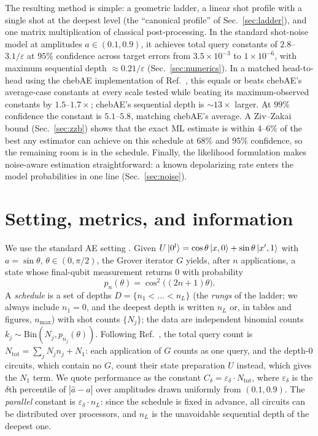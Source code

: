 \documentclass[%
 twocolumn,
 amsmath,amssymb,
prx,
longbibliography
]{revtex4-2}
\newcommand{\Ntot}{N_{\mathrm{tot}}}
\begin{document}
The resulting method is simple: a geometric ladder, a linear shot profile with a single shot at the deepest level (the ``canonical profile'' of Sec.~\ref{sec:ladder}), and one matrix multiplication of classical post-processing. In the standard shot-noise model at amplitudes $a \in (0.1, 0.9)$, it achieves total query constants of $2.8$--$3.1/\varepsilon$ at $95\%$ confidence across target errors from $3.5\times 10^{-3}$ to $1\times 10^{-6}$, with maximum sequential depth $\approx 0.21/\varepsilon$ (Sec.~\ref{sec:numerics}). In a matched head-to-head using the chebAE implementation of Ref.~\cite{Rall2023amplitudeestimation}, this equals or beats chebAE's average-case constants at every scale tested while beating its maximum-observed constants by $1.5$--$1.7\times$; chebAE's sequential depth is $\sim 13\times$ larger. At $99\%$ confidence the constant is $5.1$--$5.8$, matching chebAE's average. A Ziv--Zakai bound (Sec.~\ref{sec:zzb}) shows that the exact \ac{ML} estimate is within $4$--$6\%$ of the best any estimator can achieve on this schedule at $68\%$ and $95\%$ confidence, so the remaining room is in the schedule. Finally, the likelihood formulation makes noise-aware estimation straightforward: a known depolarizing rate enters the model probabilities in one line (Sec.~\ref{sec:noise}).

\section{Setting, metrics, and information}\label{sec:setting}

We use the standard \ac{AE} setting \cite{brassard2002quantum, labib2024csae}. Given $U\ket{0^l} = \cos\theta\ket{x,0} + \sin\theta\ket{x',1}$ with $a = \sin\theta$, $\theta \in (0, \pi/2)$, the Grover iterator $G$ yields, after $n$ applications, a state whose final-qubit measurement returns $0$ with probability
\begin{equation}\label{eq:model}
    p_n(\theta) = \cos^2\!\big((2n+1)\theta\big).
\end{equation}
A \emph{schedule} is a set of depths $D = \{n_1 < \dots < n_L\}$ (the \emph{rungs} of the ladder; we always include $n_1 = 0$, and the deepest depth is written $n_L$ or, in tables and figures, $n_{\max}$) with shot counts $\{N_j\}$; the data are independent binomial counts $k_j \sim \mathrm{Bin}(N_j, p_{n_j}(\theta))$. Following Ref.~\cite{labib2024csae}, the total query count is $\Ntot = \sum_j N_j n_j + N_1$: each application of $G$ counts as one query, and the depth-$0$ circuits, which contain no $G$, count their state preparation $U$ instead, which gives the $N_1$ term. We quote performance as the constant $C_\delta = \varepsilon_\delta \cdot \Ntot$, where $\varepsilon_\delta$ is the $\delta$th percentile of $|\hat a - a|$ over amplitudes drawn uniformly from $(0.1, 0.9)$. The \emph{parallel} constant is $\varepsilon_\delta \cdot n_L$: since the schedule is fixed in advance, all circuits can be distributed over processors, and $n_L$ is the unavoidable sequential depth of the deepest one.
\end{document}
